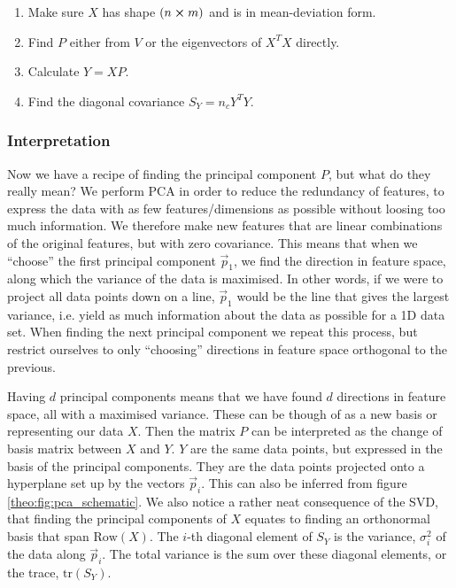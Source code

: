     \begin{enumerate}
        \item Make sure $X$ has shape $(n\cross m)$ and is in mean-deviation form.
        \item Find $P$ either from $V$ or the eigenvectors of $X^TX$ directly.
        \item Calculate $Y=XP$.
        \item Find the diagonal covariance $S_Y=n_cY^TY$.
    \end{enumerate}
    
    \subsubsection{Interpretation}
    Now we have a recipe of finding the principal component $P$, but what do they really mean? We perform PCA in order to reduce the redundancy of features, to express the data with as few features/dimensions as possible without loosing too much information. We therefore make new features that are linear combinations of the original features, but with zero covariance. This means that when we ``choose'' the first principal component $\vec{p}_1$, we find the direction in feature space, along which the variance of the data is maximised. In other words, if we were to project all data points down on a line, $\vec{p}_1$ would be the line that gives the largest variance, i.e. yield as much information about the data as possible for a 1D data set. When finding the next principal component we repeat this process, but restrict ourselves to only ``choosing'' directions in feature space orthogonal to the previous. 
    
    Having $d$ principal components means that we have found $d$ directions in feature space, all with a maximised variance. These can be though of as a new basis or representing our data $X$. Then the matrix $P$ can be interpreted as the change of basis matrix between $X$ and $Y$. $Y$ are the same data points, but expressed in the basis of the principal components. They are the data points projected onto a hyperplane set up by the vectors $\vec{p}_i$. This can also be inferred from figure \ref{theo:fig:pca_schematic}. We also notice a rather neat consequence of the SVD, that finding the principal components of $X$ equates to finding an orthonormal basis that span $\text{Row}(X)$. The $i$-th diagonal element of $S_Y$ is the variance, $\sigma_i^2$ of the data along $\vec{p}_i$. The total variance is the sum over these diagonal elements, or the trace, $\text{tr}(S_Y)$.

